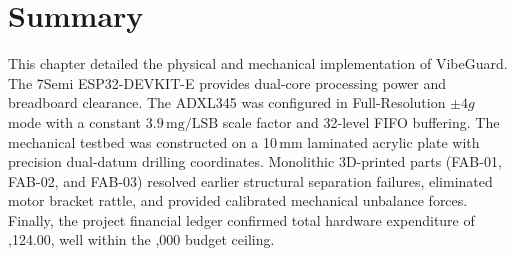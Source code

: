 \section{Summary}
This chapter detailed the physical and mechanical implementation of VibeGuard. The 7Semi ESP32-DEVKIT-E provides dual-core processing power and breadboard clearance. The ADXL345 was configured in Full-Resolution $\pm 4g$ mode with a constant $3.9\,\text{mg/LSB}$ scale factor and 32-level FIFO buffering. The mechanical testbed was constructed on a 10\,mm laminated acrylic plate with precision dual-datum drilling coordinates. Monolithic 3D-printed parts (FAB-01, FAB-02, and FAB-03) resolved earlier structural separation failures, eliminated motor bracket rattle, and provided calibrated mechanical unbalance forces. Finally, the project financial ledger confirmed total hardware expenditure of ,124.00, well within the ,000 budget ceiling.
